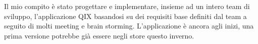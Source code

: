 Il mio compito è stato progettare e implementare, insieme ad un intero team di sviluppo, 
l'applicazione QIX basandosi su dei requisiti base definiti dal team a seguito di molti meeting 
e brain storming. L'applicazione è ancora agli inizi, una prima versione potrebbe già essere
negli store questo inverno.